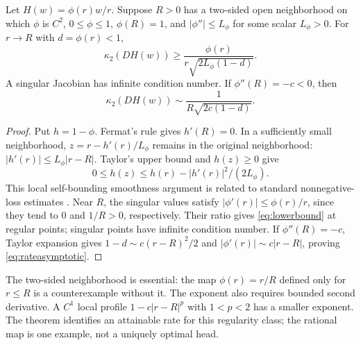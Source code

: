 \begin{theorem}
\label{thm:rate}
Let $H(w)=\phi(r)w/r$. Suppose $R>0$ has a two-sided open neighborhood on which $\phi$ is $C^2$, $0\leq\phi\leq1$, $\phi(R)=1$, and $|\phi''|\leq L_\phi$ for some scalar $L_\phi>0$. For $r\to R$ with $d=\phi(r)<1$,
\begin{equation}
 \kappa_2(DH(w))\geq\frac{\phi(r)}{r\sqrt{2L_\phi(1-d)}}.
 \label{eq:lowerbound}
\end{equation}
A singular Jacobian has infinite condition number. If $\phi''(R)=-c<0$, then
\begin{equation}
 \kappa_2(DH(w))\sim\frac{1}{R\sqrt{2c(1-d)}}.
 \label{eq:rateasymptotic}
\end{equation}
\end{theorem}
\begin{proof}
Put $h=1-\phi$. Fermat's rule gives $h'(R)=0$. In a sufficiently small neighborhood, $z=r-h'(r)/L_\phi$ remains in the original neighborhood: $|h'(r)|\leq L_\phi|r-R|$. Taylor's upper bound and $h(z)\geq0$ give
\begin{equation*}
 0\leq h(z)\leq h(r)-|h'(r)|^2/(2L_\phi).
\end{equation*}
This local self-bounding smoothness argument is related to standard nonnegative-loss estimates \cite{selfbound}. Near $R$, the singular values satisfy $|\phi'(r)|\le\phi(r)/r$, since they tend to $0$ and $1/R>0$, respectively. Their ratio gives \eqref{eq:lowerbound} at regular points; singular points have infinite condition number. If $\phi''(R)=-c$, Taylor expansion gives $1-d\sim c(r-R)^2/2$ and $|\phi'(r)|\sim c|r-R|$, proving \eqref{eq:rateasymptotic}.
\end{proof}
The two-sided neighborhood is essential: the map $\phi(r)=r/R$ defined only for $r\leq R$ is a counterexample without it. The exponent also requires bounded second derivative. A $C^1$ local profile $1-c|r-R|^p$ with $1<p<2$ has a smaller exponent. The theorem identifies an attainable rate for this regularity class; the rational map is one example, not a uniquely optimal head.

